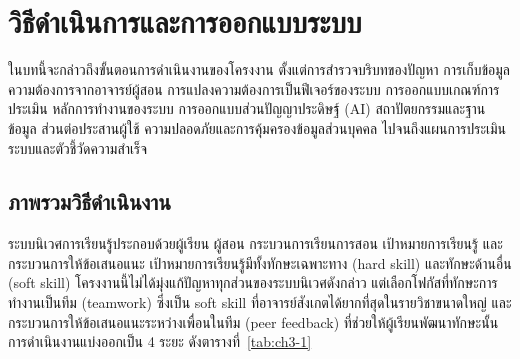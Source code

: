 
\chapter{วิธีดำเนินการและการออกแบบระบบ}
\label{ch:method}

ในบทนี้จะกล่าวถึงขั้นตอนการดำเนินงานของโครงงาน ตั้งแต่การสำรวจบริบทของปัญหา การเก็บข้อมูลความต้องการจากอาจารย์ผู้สอน การแปลงความต้องการเป็นฟีเจอร์ของระบบ การออกแบบเกณฑ์การประเมิน หลักการทำงานของระบบ การออกแบบส่วนปัญญาประดิษฐ์ (AI) สถาปัตยกรรมและฐานข้อมูล ส่วนต่อประสานผู้ใช้ ความปลอดภัยและการคุ้มครองข้อมูลส่วนบุคคล ไปจนถึงแผนการประเมินระบบและตัวชี้วัดความสำเร็จ

\section{ภาพรวมวิธีดำเนินงาน}\label{sec:3.1}

ระบบนิเวศการเรียนรู้ประกอบด้วยผู้เรียน ผู้สอน กระบวนการเรียนการสอน เป้าหมายการเรียนรู้ และกระบวนการให้ข้อเสนอแนะ เป้าหมายการเรียนรู้มีทั้งทักษะเฉพาะทาง (hard skill) และทักษะด้านอื่น (soft skill) โครงงานนี้ไม่ได้มุ่งแก้ปัญหาทุกส่วนของระบบนิเวศดังกล่าว แต่เลือกโฟกัสที่ทักษะการทำงานเป็นทีม (teamwork) ซึ่งเป็น soft skill ที่อาจารย์สังเกตได้ยากที่สุดในรายวิชาขนาดใหญ่ และกระบวนการให้ข้อเสนอแนะระหว่างเพื่อนในทีม (peer feedback) ที่ช่วยให้ผู้เรียนพัฒนาทักษะนั้น การดำเนินงานแบ่งออกเป็น 4 ระยะ ดังตารางที่~\ref{tab:ch3-1}

